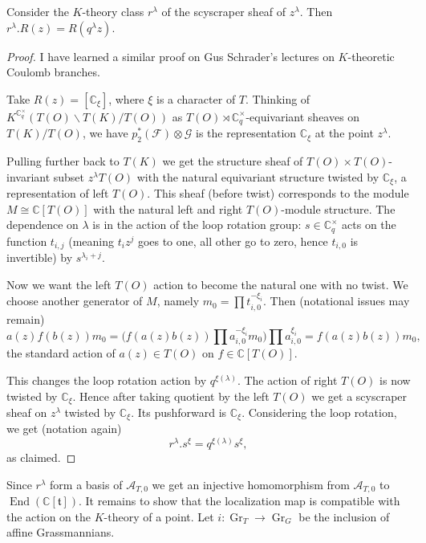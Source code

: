 \documentclass{article}
\renewcommand{\C}{\mathbb{C}}
\newcommand{\mf}{\mathfrak}
\newcommand{\mc}[1]{\mathcal{#1}}
\newcommand{\End}{\operatorname{End}}
\newcommand{\Gr}{\operatorname{Gr}}
\begin{document}
\begin{prop}
\label{PropActionTZero}
Consider the $K$-theory class $r^{\lambda}$ of the scyscraper sheaf of $z^{\lambda}$. Then $r^{\lambda}.R(z)=R(q^{\lambda}z)$.
\end{prop}
\begin{proof}
I have learned a similar proof on Gus Schrader's lectures on $K$-theoretic Coulomb branches.

Take $R(z)=[\C_{\xi}]$, where $\xi$ is a character of $T$. Thinking of $K^{\C^{\times}_q}(T(O)\backslash T(K)/T(O))$ as $T(O)\rtimes \C^{\times}_q$-equivariant sheaves on $T(K)/T(O)$, we have $p_2^*(\mc{F})\otimes \mc{G}$ is the representation $\C_{\xi}$ at the point $z^{\lambda}$. 

Pulling further back to $T(K)$ we get the structure sheaf of $T(O)\times T(O)$-invariant subset $z^{\lambda}T(O)$ with the natural equivariant structure twisted by $\C_{\xi}$, a representation of left $T(O)$. This sheaf (before twist) corresponds to the module $M\cong \C[T(O)]$ with the natural left and right $T(O)$-module structure. The dependence on $\lambda$ is in the action of the loop rotation group: $s\in \C^{\times}_q$ acts on the function $t_{i,j}$ (meaning $t_iz^j$ goes to one, all other go to zero, hence $t_{i,0}$ is invertible) by $s^{\lambda_i+j}$.

Now we want the left $T(O)$ action to become the natural one with no twist. We choose another generator of $M$, namely $m_0=\prod t_{i,0}^{-\xi_i}$. Then (notational issues may remain) \[a(z)f(b(z))m_0=\big(f(a(z)b(z))\prod a_{i,0}^{-\xi_i}m_0\big) \prod a_{i,0}^{\xi_i}=f(a(z)b(z))m_0,\] the standard action of $a(z)\in T(O)$ on $f\in \C[T(O)]$.

This changes the loop rotation action by $q^{\xi(\lambda)}$. The action of right $T(O)$ is now twisted by $\C_{\xi}$. Hence after taking quotient by the left $T(O)$ we get a scyscraper sheaf on $z^{\lambda}$ twisted by $\C_{\xi}$. Its pushforward is $\C_{\xi}$. Considering the loop rotation, we get (notation again)
\[r^{\lambda}.s^{\xi}=q^{\xi(\lambda)}s^{\xi},\] as claimed.
\end{proof}
Since $r^{\lambda}$ form a basis of $\mc{A}_{T,0}$ we get an injective homomorphism from $\mc{A}_{T,0}$ to $\End(\C[\mf{t}])$. 
It remains to show that the localization map is compatible with the action on the $K$-theory of a point. Let $i\colon \Gr_T\to \Gr_G$ be the inclusion of affine Grassmannians.
\end{document}
